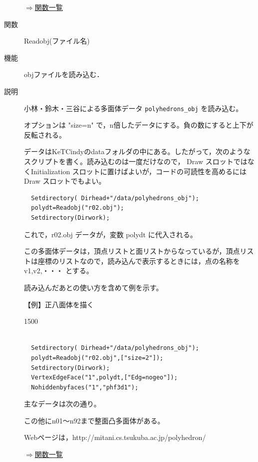 \documentclass[papersize,a4paper,12pt,uplatex]{jsarticle}
\begin{document}
\begin{description}
\begin{flushright} \hyperlink{functionlist}{$\Rightarrow$関数一覧}\end{flushright}

\vspace{\baselineskip}
\hypertarget{readobj}{}
\item[関数]  Readobj(ファイル名)
\item[機能]  objファイルを読み込む．
\item[説明]  小林・鈴木・三谷による多面体データ \verb|polyhedrons_obj|   を読み込む。

オプションは "size=n"  で，n倍したデータにする。負の数にすると上下が反転される。

データはKeTCindyのdataフォルダの中にある。したがって，次のようなスクリプトを書く。読み込むのは一度だけなので， Draw スロットではなくInitialization スロットに置けばよいが，コードの可読性を高めるには Draw スロットでもよい。
\begin{verbatim}
  Setdirectory( Dirhead+"/data/polyhedrons_obj");
  polydt=Readobj("r02.obj");
  Setdirectory(Dirwork);
\end{verbatim}
これで，r02.obj データが，変数 polydt に代入される。

この多面体データは，頂点リストと面リストからなっているが，頂点リストは座標のリストなので，読み込んで表示するときには，点の名称を v1,v2,・・・ とする。

読み込んだあとの使い方を含めて例を示す。

\vspace{\baselineskip}
【例】正八面体を描く
\begin{layer}{150}{0}
\end{layer}

\begin{verbatim}

  Setdirectory( Dirhead+"/data/polyhedrons_obj");
  polydt=Readobj("r02.obj",["size=2"]);
  Setdirectory(Dirwork);
  VertexEdgeFace("1",polydt,["Edg=nogeo"]);
  Nohiddenbyfaces("1","phf3d1");
\end{verbatim}

主なデータは次の通り。

\vspace{\baselineskip}
  

この他にn01〜n92まで整面凸多面体がある。

Webページは，http://mitani.cs.tsukuba.ac.jp/polyhedron/


\begin{flushright} \hyperlink{functionlist}{$\Rightarrow$関数一覧}\end{flushright}


\end{description}
\end{document}

